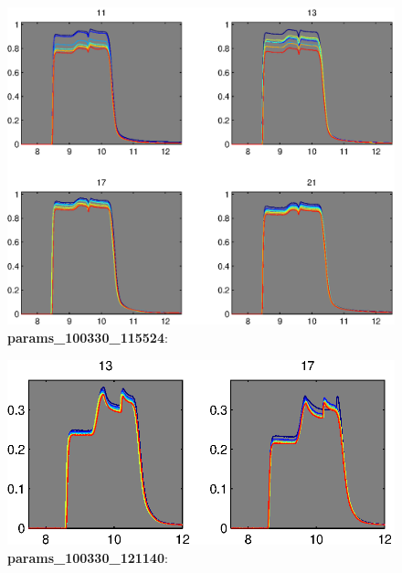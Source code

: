 \documentclass[a4paper]{report}
\begin{document}
\begin{figure}
\centering
\includegraphics[width=5in]{params_100330_115524.eps}
\caption{\textbf{params\_100330\_115524}:}
\end{figure}


\begin{figure}
\centering
\includegraphics[width=5in]{params_100330_121140.eps}
\caption{\textbf{params\_100330\_121140}:}
\end{figure}
\end{document}

